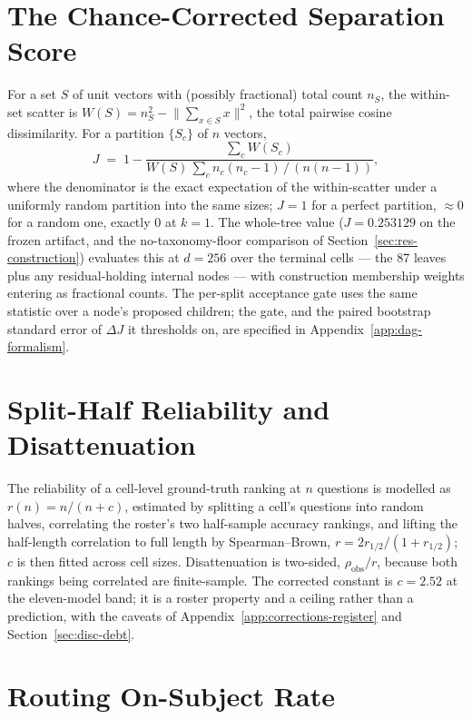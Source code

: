 \section{The Chance-Corrected Separation Score}\label{sec:app-metrics-J}

For a set $S$ of unit vectors with (possibly fractional) total count $n_S$, the
within-set scatter is $W(S) = n_S^2 - \lVert \sum_{x \in S} x \rVert^2$, the total
pairwise cosine dissimilarity. For a partition $\{S_c\}$ of $n$ vectors,
\[
J \;=\; 1 - \frac{\sum_c W(S_c)}{W(S)\,\sum_c n_c(n_c-1)\,/\,(n(n-1))},
\]
where the denominator is the exact expectation of the within-scatter under a uniformly
random partition into the same sizes; $J = 1$ for a perfect partition, $\approx 0$ for
a random one, exactly $0$ at $k = 1$. The whole-tree value ($J = 0.253129$ on the
frozen artifact, and the no-taxonomy-floor comparison of
Section~\ref{sec:res-construction}) evaluates this at $d = 256$ over the terminal
cells --- the 87 leaves plus any residual-holding internal nodes --- with construction
membership weights entering as fractional counts. The per-split acceptance gate uses
the same statistic over a node's proposed children; the gate, and the paired bootstrap
standard error of $\Delta J$ it thresholds on, are specified in
Appendix~\ref{app:dag-formalism}.

\section{Split-Half Reliability and Disattenuation}\label{sec:app-metrics-reliability}

The reliability of a cell-level ground-truth ranking at $n$ questions is modelled as
$r(n) = n/(n + c)$, estimated by splitting a cell's questions into random halves,
correlating the roster's two half-sample accuracy rankings, and lifting the
half-length correlation to full length by Spearman--Brown,
$r = 2r_{1/2}/(1 + r_{1/2})$; $c$ is then fitted across cell sizes. Disattenuation is
two-sided, $\rho_{\text{obs}}/r$, because both rankings being correlated are
finite-sample. The corrected constant is $c = 2.52$ at the eleven-model band; it is a
roster property and a ceiling rather than a prediction, with the caveats of
Appendix~\ref{app:corrections-register} and Section~\ref{sec:disc-debt}.

\section{Routing On-Subject Rate}\label{sec:app-metrics-onsubject}

